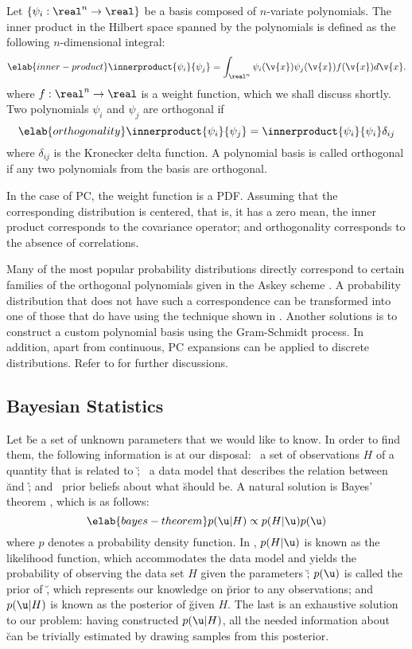 Let $\{ \psi_i: \real^n \to \real \}$ be a basis composed of $n$-variate
polynomials. The inner product in the Hilbert space spanned by the polynomials
is defined as the following $n$-dimensional integral:
\begin{equation} \elab{inner-product}
  \innerproduct{\psi_i}{\psi_j} = \int_{\real^n} \psi_i(\v{x}) \psi_j(\v{x}) f(\v{x}) d\v{x}.
\end{equation}
where $f: \real^n \to \real$ is a weight function, which we shall discuss
shortly. Two polynomials $\psi_i$ and $\psi_j$ are orthogonal if
\begin{equation} \elab{orthogonality}
  \innerproduct{\psi_i}{\psi_j} = \innerproduct{\psi_i}{\psi_i} \delta_{ij}
\end{equation}
where $\delta_{ij}$ is the Kronecker delta function. A polynomial basis is
called orthogonal if any two polynomials from the basis are orthogonal.

In the case of \ac{PC}, the weight function is a \ac{PDF}. Assuming that the
corresponding distribution is centered, that is, it has a zero mean, the inner
product corresponds to the covariance operator; and orthogonality corresponds to
the absence of correlations.

Many of the most popular probability distributions directly correspond to
certain families of the orthogonal polynomials given in the Askey scheme
\cite{xiu2010}. A probability distribution that does not have such a
correspondence can be transformed into one of those that do have using the
technique shown in . Another solutions is to
construct a custom polynomial basis using the Gram-Schmidt process. In addition,
apart from continuous, PC expansions can be applied to discrete distributions.
Refer to \cite{xiu2010} for further discussions.

\subsection{Bayesian Statistics}

Let \u be a set of unknown parameters that we would like to know. In order to
find them, the following information is at our disposal: \one~a set of
observations $H$ of a quantity \h that is related to \u; \two~a data model that
describes the relation between \u and \h; and \three~prior beliefs about what \u
should be. A natural solution is Bayes' theorem \cite{gelman2004}, which is as
follows:
\begin{equation} \elab{bayes-theorem}
  p(\u | H) \propto p(H | \u) p(\u)
\end{equation}
where $p$ denotes a probability density function. In , $p(H
| \u)$ is known as the likelihood function, which accommodates the data model
and yields the probability of observing the data set $H$ given the parameters
\u; $p(\u)$ is called the prior of \u, which represents our knowledge on \u
prior to any observations; and $p(\u | H)$ is known as the posterior of \u given
$H$. The last is an exhaustive solution to our problem: having constructed $p(\u
| H)$, all the needed information about \u can be trivially estimated by drawing
samples from this posterior.

